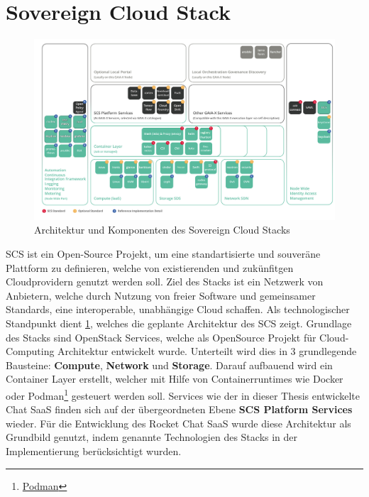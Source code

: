 \section{Sovereign Cloud Stack}
\label{sec:gaia-x-einbettung:scs}

\begin{figure}[h]
  \centering
  \includegraphics[height=0.71\textwidth]{gfx/chapters/4_gaia-X/scs_architecture.png}
  \caption{Architektur und Komponenten des Sovereign Cloud Stacks}
  \label{fig:scs_architecture}
\end{figure}

\ac{SCS} ist ein Open-Source Projekt, um eine standartisierte und souveräne Plattform zu definieren, welche von 
existierenden und zukünfitgen Cloudprovidern genutzt werden soll. 
Ziel des Stacks ist ein Netzwerk von Anbietern, welche durch Nutzung von freier Software und gemeinsamer Standards,
eine interoperable, unabhängige Cloud schaffen.\cite{Kagermann2021}
Als technologischer Standpunkt dient \ref{fig:scs_architecture}, welches die geplante Architektur des \ac{SCS} zeigt. 
Grundlage des Stacks sind OpenStack Services, welche als OpenSource Projekt für Cloud-Computing Architektur entwickelt wurde.
Unterteilt wird dies in 3 grundlegende Bausteine: \textbf{Compute}, \textbf{Network} und \textbf{Storage}. Darauf aufbauend
wird ein Container Layer erstellt, welcher mit Hilfe von Containerruntimes wie Docker oder Podman\footnote{\href{https://podman.io}{Podman}} gesteuert werden soll.\cite{scs}
Services wie der in dieser Thesis entwickelte Chat \ac{SaaS} finden sich auf der übergeordneten Ebene \textbf{SCS Platform Services} wieder.
Für die Entwicklung des Rocket Chat \ac{SaaS} wurde diese Architektur als Grundbild genutzt, indem 
genannte Technologien des Stacks in der Implementierung berücksichtigt wurden.